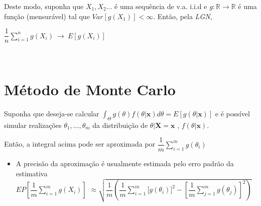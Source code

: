 \documentclass[
]{book}
\providecommand{\tightlist}{%
  \setlength{\itemsep}{0pt}\setlength{\parskip}{0pt}}
\begin{document}
Deste modo, suponha que \(X_1,X_2...\) é uma sequência de v.a. i.i.d e \(g:\mathbb{R} \longrightarrow\mathbb{R}\) é uma função (mensurável) tal que \(Var\left[g(X_1)\right]<\infty\). Então, pela \emph{LGN},

\(\dfrac{1}{n}\displaystyle \sum_{i=1}^n g(X_i) ~\longrightarrow~ E\left[g(X_i)\right]\)

\(~\)

\hypertarget{muxe9todo-de-monte-carlo}{%
\section{Método de Monte Carlo}\label{muxe9todo-de-monte-carlo}}

Suponha que deseja-se calcular \(\displaystyle\int_\Theta g(\theta)f(\theta|\boldsymbol x)d\theta=E\left[g(\theta|\boldsymbol x)\right]\) e é possível simular realizações \(\theta_1,...,\theta_m\) da distribuição de \(\theta |\boldsymbol X=\boldsymbol x\) , \(f(\theta | \boldsymbol x)\).

Então, a integral acima pode ser aproximada por \(\displaystyle \dfrac{1}{m}\sum_{i=1}^m g(\theta_i)\)

\begin{itemize}
\tightlist
\item
  A precisão da aproximação é usualmente estimada pelo erro padrão da estimativa\\
  \(\displaystyle EP\left[\dfrac{1}{m}\sum_{i=1}^m g(X_i)\right]\)
  \(\approx \displaystyle \sqrt{\dfrac{1}{m}\left(\dfrac{1}{m}\sum_{i=1}^m\Big[g(\theta_i)\Big]^2-\left[\dfrac{1}{m}\sum_{j=1}^mg(\theta_j)\right]^2\right)}\)
\end{itemize}

\(~\)
\end{document}
